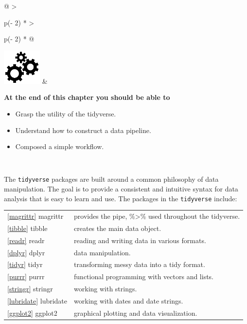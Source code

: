 \documentclass[
]{book}
\begin{document}
\begin{longtable}[]{@{}
  >{\raggedright\arraybackslash}p{(\columnwidth - 2\tabcolsep) * }
  >{\raggedright\arraybackslash}p{(\columnwidth - 2\tabcolsep) * }@{}}
\toprule\noalign{}
\endhead
\bottomrule\noalign{}
\endlastfoot
\includegraphics[width=\textwidth,height=0.70833in]{images/03.png} & \begin{minipage}[t]{\linewidth}\raggedright
\textbf{At the end of this chapter you should be able to}

\begin{itemize}
\item
  Grasp the utility of the tidyverse.
\item
  Understand how to construct a data pipeline.
\item
  Composed a simple workflow.
\end{itemize}
\end{minipage} \\
\end{longtable}

\hfill\break

The \texttt{tidyverse} packages are built around a common philosophy of data manipulation. The goal is to provide a consistent and intuitive syntax for data analysis that is easy to learn and use. The packages in the \texttt{tidyverse} include:

\begin{longtable}[]{@{}
  >{\raggedright\arraybackslash}p{}
  >{\raggedright\arraybackslash}p{}@{}}
\toprule\noalign{}
\endhead
\bottomrule\noalign{}
\endlastfoot
\ref{magrittr} magrittr & provides the pipe, \%\textgreater\% used throughout the tidyverse. \\
\ref{tibble} tibble & creates the main data object. \\
\ref{readr} readr & reading and writing data in various formats. \\
\ref{dplyr} dplyr & data manipulation. \\
\ref{tidyr} tidyr & transforming messy data into a tidy format. \\
\ref{purrr} purrr & functional programming with vectors and lists. \\
\ref{stringr} stringr & working with strings. \\
\ref{lubridate} lubridate & working with dates and date strings. \\
\ref{ggplot2} ggplot2 & graphical plotting and data visualization. \\
\end{longtable}
\end{document}
